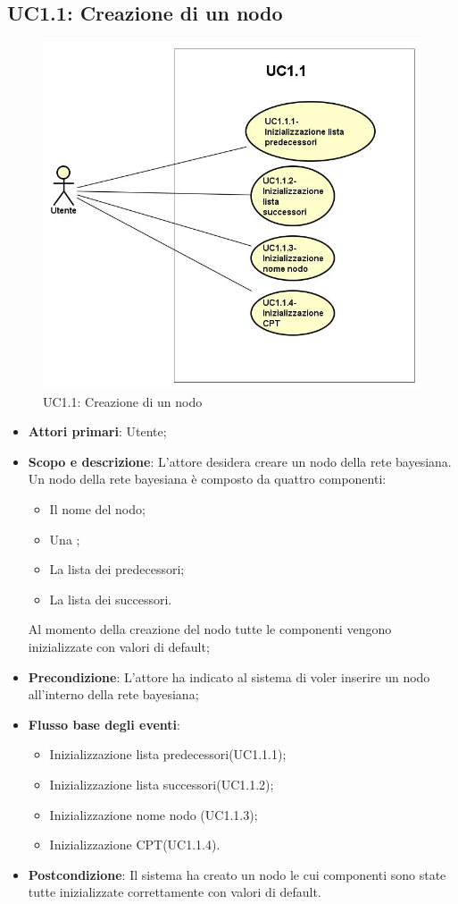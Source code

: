 \subsection{UC1.1: Creazione di un nodo} 
\begin{figure} [H]
	\centering
	\includegraphics[scale=0.45]{Img/UC1-1} 
	\caption{UC1.1: Creazione di un nodo} \label{} 
\end{figure} 
\begin{itemize} 
	\item{\textbf{Attori primari}: Utente;} 
	\item{\textbf{Scopo e descrizione}: L'attore desidera creare un nodo della rete bayesiana. Un nodo della rete bayesiana è composto da quattro componenti: 
		\begin{itemize} 
			\item{Il nome del nodo;} 
			\item{Una ;} 
			\item{La lista dei predecessori;} 
			\item{La lista dei successori.} 
		\end{itemize} 
		Al momento della creazione del nodo tutte le componenti vengono inizializzate con valori di default;} 
	\item{\textbf{Precondizione}: L'attore ha indicato al sistema di voler inserire un nodo all'interno della rete bayesiana;} 
	\item{\textbf{Flusso base degli eventi}: } 
	\begin{itemize} 
		\item{Inizializzazione lista predecessori(UC1.1.1);} 
		\item{Inizializzazione lista successori(UC1.1.2);} 
		\item{Inizializzazione nome nodo (UC1.1.3);} 
		\item{Inizializzazione CPT(UC1.1.4).} 
	\end{itemize} 
	\item{\textbf{Postcondizione}: Il sistema ha creato un nodo le cui componenti sono state tutte inizializzate correttamente con valori di default.} 
\end{itemize} 
